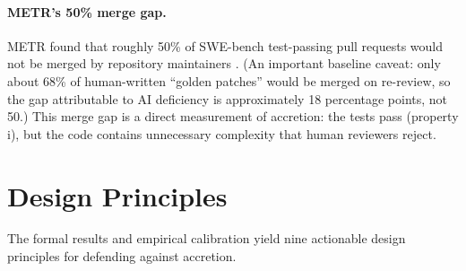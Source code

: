 \documentclass[11pt, a4paper, copyright]{googledeepmind}
\begin{document}
\paragraph{METR's 50\% merge gap.} METR found that roughly 50\% of SWE-bench test-passing pull requests would not be merged by repository maintainers \citep{metr2026swebench}. (An important baseline caveat: only about 68\% of human-written ``golden patches'' would be merged on re-review, so the gap attributable to AI deficiency is approximately 18 percentage points, not 50.) This merge gap is a direct measurement of accretion: the tests pass (property i), but the code contains unnecessary complexity that human reviewers reject.


\section{Design Principles}
\label{sec:principles}

The formal results and empirical calibration yield nine actionable design principles for defending against accretion.
\end{document}
